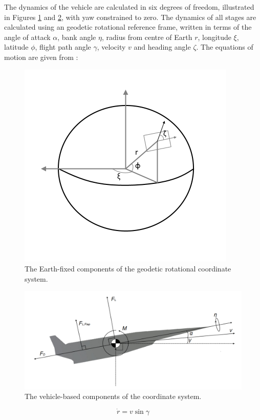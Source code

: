 The dynamics of the vehicle are calculated in six degrees of freedom, illustrated in Figures \ref{fig:global} and \ref{fig:Axes}, with yaw constrained to zero. 
The dynamics of all stages are calculated using an geodetic rotational reference frame, written in terms of the angle of attack $\alpha$, bank angle $\eta$, radius from centre of Earth $r$, longitude $\xi$, latitude $\phi$, flight path angle $\gamma$, velocity $v$ and heading angle $\zeta$. The equations of motion are given from \cite{Josselyn2002a}:
\begin{figure}[ht]
	\centering
	\includegraphics[width=0.7\linewidth]{figures/4_LODESTAR/global}
	\caption{The Earth-fixed components of the geodetic rotational coordinate system.}
	\label{fig:global}
\end{figure}
\begin{figure}[ht]
	\centering
	\includegraphics[width=0.9\linewidth]{figures/4_LODESTAR/Axes}
	\caption{The vehicle-based components of the coordinate system.}
	\label{fig:Axes}
\end{figure}


\begin{equation}
\dot{r} = v \sin \gamma
\end{equation}

